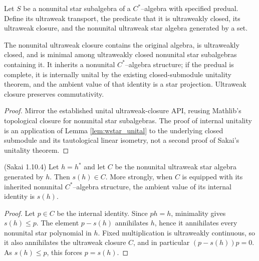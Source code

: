 \begin{definition}
  \label{def:nonunital_ultraweak_closure}
  \notready
  Let $S$ be a nonunital star subalgebra of a $C^{*}$--algebra with specified predual.  Define its
  ultraweak transport, the predicate that it is ultraweakly closed, its ultraweak closure, and the
  nonunital ultraweak star algebra generated by a set.
\end{definition}

\begin{proposition}
  \label{prop:nonunital_ultraweak_closure_api}
  \notready
  The nonunital ultraweak closure contains the original algebra, is ultraweakly closed, and is
  minimal among ultraweakly closed nonunital star subalgebras containing it.  It inherits a
  nonunital $C^{*}$--algebra structure; if the predual is complete, it is internally unital by the
  existing closed-submodule unitality theorem, and the ambient value of that identity is a star
  projection.  Ultraweak closure preserves commutativity.
\end{proposition}

\begin{proof}
  \notready
  Mirror the established unital ultraweak-closure API, reusing Mathlib's topological closure for
  nonunital star subalgebras.  The proof of internal unitality is an application of Lemma
  \ref{lem:wstar_unital} to the underlying closed submodule and its tautological linear isometry,
  not a second proof of Sakai's unitality theorem.
\end{proof}

\begin{proposition}
  \label{prop:support_mem_generated_wstar_Sak_1_10_4} (Sakai 1.10.4)
  \notready
  Let $h=h^{*}$ and let $C$ be the nonunital ultraweak star algebra generated by $h$.  Then
  $s(h)\in C$.  More strongly, when $C$ is equipped with its inherited nonunital
  $C^{*}$--algebra structure, the ambient value of its internal identity is $s(h)$.
\end{proposition}

\begin{proof}
  \notready
  Let $p\in C$ be the internal identity.  Since $ph=h$, minimality gives $s(h)\leq p$.
  The element $p-s(h)$ annihilates $h$, hence it annihilates every nonunital star polynomial in
  $h$.  Fixed multiplication is ultraweakly continuous, so it also annihilates the ultraweak
  closure $C$, and in particular $(p-s(h))p=0$.  As $s(h)\leq p$, this forces $p=s(h)$.
\end{proof}

